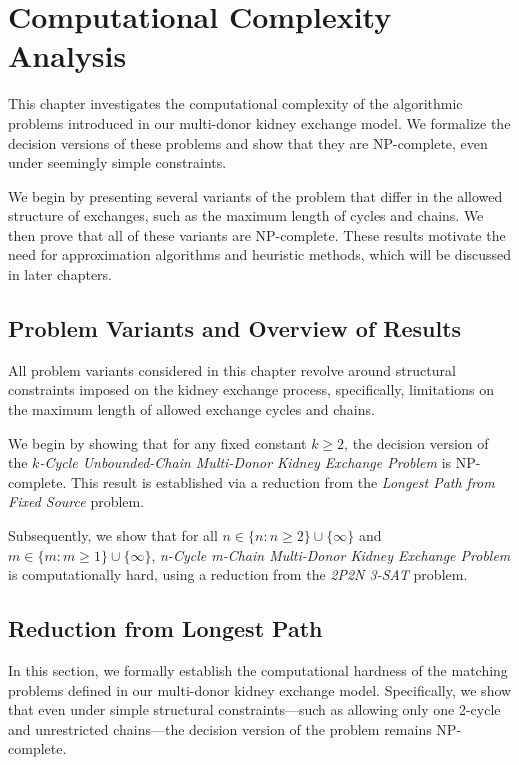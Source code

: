 \chapter{Computational Complexity Analysis}
\label{cha:computational_complexity_analysis}

This chapter investigates the computational complexity of the algorithmic problems introduced in our multi-donor kidney exchange model. We formalize the decision versions of these problems and show that they are NP-complete, even under seemingly simple constraints.

We begin by presenting several variants of the problem that differ in the allowed structure of exchanges, such as the maximum length of cycles and chains. We then prove that all of these variants are NP-complete. These results motivate the need for approximation algorithms and heuristic methods, which will be discussed in later chapters.

\section{Problem Variants and Overview of Results}

All problem variants considered in this chapter revolve around structural constraints imposed on the kidney exchange process, specifically, limitations on the maximum length of allowed exchange cycles and chains.

We begin by showing that for any fixed constant $k \ge 2$, the decision version of the \textit{$k$-Cycle Unbounded-Chain Multi-Donor Kidney Exchange Problem} is NP-complete. This result is established via a reduction from the \textit{Longest Path from Fixed Source} problem.

Subsequently, we show that for all $n \in \{n : n \ge 2\} \cup \{\infty\}$ and $m \in \{m:m \ge 1\} \cup \{\infty\}$, \textit{n-Cycle m-Chain Multi-Donor Kidney Exchange Problem} is computationally hard, using a reduction from the \textit{2P2N 3-SAT} problem.



\section{Reduction from Longest Path}

In this section, we formally establish the computational hardness of the matching problems defined in our multi-donor kidney exchange model. Specifically, we show that even under simple structural constraints—such as allowing only one 2-cycle and unrestricted chains—the decision version of the problem remains NP-complete. 

